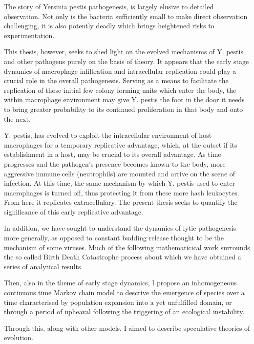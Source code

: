 \documentclass[twoside,12pt]{Classes/myThesis}
\theoremstyle{plain} %
\begin{document}
\vspace{0pt}
\noindent
The story of Yersinia pestis pathogenesis,  is largely elusive to detailed observation.  Not only is the bacteria sufficiently small to make direct observation challenging,  it is also potently deadly which brings heightened risks to experimentation. \par
This thesis,  however,  seeks to shed light on the evolved mechanisms of Y. pestis and other pathogens purely on the basis of theory.  It appears that the early stage dynamics of macrophage infiltration and intracellular replication could play a crucial role in the overall pathogenesis.  Serving as a means to facilitate the replication of those initial few colony forming units which enter the body,  the within macrophage environment may give Y. pestis the foot in the door it needs to bring greater probability to its continued proliferation in that body and onto the next.\par


Y. pestis,  has evolved to exploit the intracellular
environment of host macrophages for a temporary replicative advantage,  which, at the outset if its establishment in a host, may be crucial to its overall advantage.  As time progresses and the pathogen's 
presence becomes known to the body, more aggressive immune cells (neutrophils) are mounted and arrive on the scene of infection.
At this time, the same mechanism by which Y. pestis used to enter macrophages is turned off, thus protecting it
from these more hash leukocytes. From here it replicates extracellulary. 
The present thesis seeks to quantify the significance of this early replicative advantage. 



In addition, we have sought to understand the dynamics of lytic pathogenesis more generally, as opposed to 
constant budding release thought to be the mechanism of some viruses.
Much of the following mathematicical work surrounds the so called Birth Death Catastrophe process about which we have 
obtained a series of analytical results. \par

Then, also in the theme of early stage dynamics, I propose an inhomogeneous continuous time Markov chain model to descrive the emergence of species over a time characterised by population expansion into a yet unfulfilled domain, or through a period of upheaval following the triggering of an ecological instability. 

Through this, along with other models, I aimed to describe speculative theories of evolution.
\end{document}
